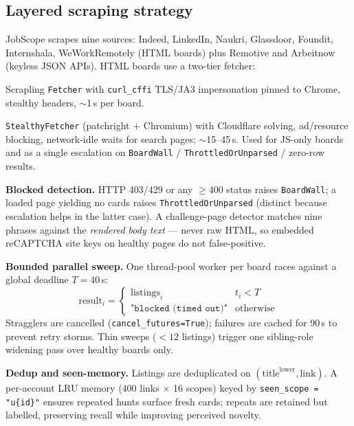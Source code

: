 \documentclass[11pt,a4paper]{article}
\newcommand{\code}[1]{\texttt{#1}}
\begin{document}
\subsection{Layered scraping strategy}
\label{sec:scraping}

JobScope scrapes nine sources: Indeed, LinkedIn, Naukri, Glassdoor, Foundit,
Internshala, WeWorkRemotely (HTML boards) plus Remotive and Arbeitnow
(keyless JSON APIs). HTML boards use a two-tier fetcher:

\begin{description}[leftmargin=6.2em, style=nextline]
  \item[Cheap path (default)] Scrapling \code{Fetcher} with
        \code{curl\_cffi} TLS/JA3 impersonation pinned to Chrome, stealthy
        headers, $\sim$1\,s per board.
  \item[Browser path] \code{StealthyFetcher} (patchright + Chromium) with
        Cloudflare solving, ad/resource blocking, network-idle waits for
        search pages; $\sim$15--45\,s. Used for JS-only boards and as a
        single escalation on \code{BoardWall} / \code{ThrottledOrUnparsed}
        / zero-row results.
\end{description}

\textbf{Blocked detection.} HTTP 403/429 or any $\geq 400$ status raises
\code{BoardWall}; a loaded page yielding no cards raises
\code{ThrottledOrUnparsed} (distinct because escalation helps in the latter
case). A challenge-page detector matches nine phrases against the
\emph{rendered body text} --- never raw HTML, so embedded reCAPTCHA site
keys on healthy pages do not false-positive.

\textbf{Bounded parallel sweep.} One thread-pool worker per board races
against a global deadline $T = 40$\,s:
\begin{equation}
  \text{result}_i =
  \begin{cases}
    \text{listings}_i & t_i < T \\
    \texttt{"blocked (timed out)"} & \text{otherwise}
  \end{cases}
\end{equation}
Stragglers are cancelled (\code{cancel\_futures=True}); failures are cached
for 90\,s to prevent retry storms. Thin sweeps ($< 12$ listings) trigger one
sibling-role widening pass over healthy boards only.

\textbf{Dedup and seen-memory.} Listings are deduplicated on
$(\text{title}^{\text{lower}}, \text{link})$. A per-account LRU memory
(400 links $\times$ 16 scopes) keyed by \code{seen\_scope = "u\{id\}"}
ensures repeated hunts surface fresh cards; repeats are retained but
labelled, preserving recall while improving perceived novelty.
\end{document}

